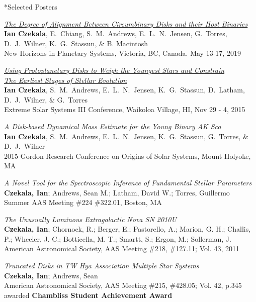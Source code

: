 \documentclass[10pt]{article}
\makeatletter
\renewcommand{\section}{\@startsection{section}{1}{0pt}{-\baselineskip}{0.5\baselineskip}{\scshape\color{myblue1}}}
\makeatother
\begin{document}
\section*{Selected Posters}
\begin{etaremune}
\item \href{https://figshare.com/articles/The_Degree_of_Alignment_Between_Circumbinary_Disks_and_Their_Host_Binaries/9209357}{\emph{The Degree of Alignment Between Circumbinary Disks and their Host Binaries}}\\
\textbf{Ian Czekala}, E.~Chiang, S.~M.~Andrews, E.~L.~N.~Jensen, G.~Torres, D.~J.~Wilner, K.~G.~Stassun, \& B. Macintosh \\
New Horizons in Planetary Systems, Victoria, BC, Canada. May 13-17, 2019
\item \href{https://figshare.com/articles/Using_Protoplanetary_Disks_to_Weigh_the_Youngest_Stars_and_Constrain_The_Earliest_Stages_of_Stellar_Evolution/1613531}{\emph{Using Protoplanetary Disks to Weigh the Youngest Stars and Constrain}}\\
\href{https://figshare.com/articles/Using_Protoplanetary_Disks_to_Weigh_the_Youngest_Stars_and_Constrain_The_Earliest_Stages_of_Stellar_Evolution/1613531}{\emph{The Earliest Stages of Stellar Evolution}} \\
\textbf{Ian Czekala}, S.~M.~Andrews, E.~L.~N.~Jensen, K.~G.~Stassun, D.~Latham, D.~J.~Wilner, \& G.~Torres\\
Extreme Solar Systems III Conference, Waikoloa Village, HI, Nov 29 - 4, 2015
\item \emph{A Disk-based Dynamical Mass Estimate for the Young Binary AK Sco}\\
\textbf{Ian Czekala}, S.~M.~Andrews, E.~L.~N.~Jensen, K.~G.~Stassun, G.~Torres, \& D.~J.~Wilner\\
2015 Gordon Research Conference on Origins of Solar Systems, Mount Holyoke, MA
\item \emph{A Novel Tool for the Spectroscopic Inference of Fundamental Stellar Parameters}\\
\textbf{Czekala, Ian};  Andrews, Sean M.; Latham, David W.; Torres, Guillermo\\
Summer AAS Meeting \#224 \#322.01, Boston, MA
\item \emph{The Unusually Luminous Extragalactic Nova SN 2010U}\\
\textbf{Czekala, Ian}; Chornock, R.; Berger, E.; Pastorello, A.; Marion, G. H.; Challis, P.; Wheeler, J. C.; Botticella, M. T.; Smartt, S.; Ergon, M.; Sollerman, J.\\
American Astronomical Society, AAS Meeting \#218, \#127.11; Vol. 43, 2011
\item \emph{Truncated Disks in TW Hya Association Multiple Star Systems}\\
\textbf{Czekala, Ian}; Andrews, Sean\\
American Astronomical Society, AAS Meeting \#215, \#428.05; Vol. 42, p.345 awarded \textbf{Chambliss Student Achievement Award}
\end{etaremune}
\end{document}
